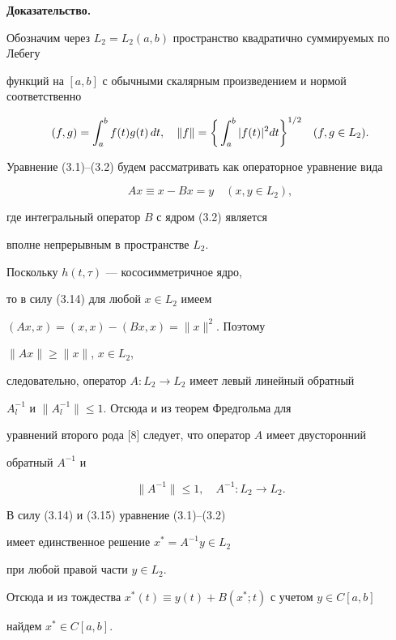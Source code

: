 {\bf Доказательство.}


Обозначим через $L_2=L_2(a,b)$ пространство квадратично суммируемых по Лебегу


функций на $[a,b]$ с обычными скалярным произведением и нормой соответственно


$$


(f,g)=\intl_a^bf(t)g(t)\, dt,\quad


\|f\|=\bigg\{\intl_a^b|f(t)|^2dt\bigg\}^{1/2}\quad (f,g\in L_2).


$$


Уравнение (3.1)--(3.2) будем рассматривать как операторное уравнение вида


\begin{equation}


Ax\equiv x-Bx=y\quad (x,y\in L_2),


\end{equation}


где интегральный оператор $B$ с ядром (3.2) является


вполне непрерывным в пространстве $L_2$. 


Поскольку $h(t,\tau)$ --- кососимметричное ядро, 


то в силу (3.14) для любой $x\in L_2$ имеем


$(Ax,x)=(x,x)-(Bx,x)=\|x\|^2$. Поэтому


$\|Ax\|\geq \|x\|$, $x\in L_2$,


следовательно, оператор $A:L_2\rightarrow L_2$ имеет левый линейный обратный


$A_l^{-1}$ и $\|A_l^{-1}\|\leq 1$. Отсюда и из теорем Фредгольма для


уравнений второго рода [8] следует, что оператор $A$ имеет двусторонний


обратный $A^{-1}$ и


\begin{equation}


\|A^{-1}\|\leq 1,\quad A^{-1}:L_2\rightarrow L_2.


\end{equation}


В силу (3.14) и (3.15) уравнение (3.1)--(3.2) 


имеет единственное решение $x^*=A^{-1}y\in L_2$


при любой правой части $y\in L_2$.


Отсюда и из тождества $x^*(t)\equiv y(t)+B(x^*;t)$ с учетом $y\in C[a,b]$


найдем $x^*\in C[a,b]$.


